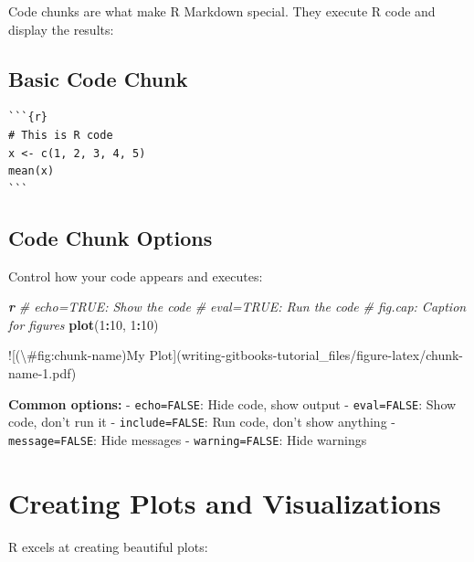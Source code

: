 \documentclass[
]{book}
\newenvironment{Shaded}{\begin{snugshade}}{\end{snugshade}}
\newcommand{\AlertTok}[1]{\textcolor[rgb]{0.94,0.16,0.16}{#1}}
\newcommand{\CommentTok}[1]{\textcolor[rgb]{0.56,0.35,0.01}{\textit{#1}}}
\newcommand{\DecValTok}[1]{\textcolor[rgb]{0.00,0.00,0.81}{#1}}
\newcommand{\FunctionTok}[1]{\textcolor[rgb]{0.13,0.29,0.53}{\textbf{#1}}}
\newcommand{\InformationTok}[1]{\textcolor[rgb]{0.56,0.35,0.01}{\textbf{\textit{#1}}}}
\newcommand{\NormalTok}[1]{#1}
\newcommand{\SpecialCharTok}[1]{\textcolor[rgb]{0.81,0.36,0.00}{\textbf{#1}}}
\begin{document}
Code chunks are what make R Markdown special. They execute R code and display the results:

\subsection{Basic Code Chunk}\label{basic-code-chunk}

\begin{verbatim}
```{r}
# This is R code
x <- c(1, 2, 3, 4, 5)
mean(x)
```
\end{verbatim}

\subsection{Code Chunk Options}\label{code-chunk-options}

Control how your code appears and executes:

\begin{Shaded}
\begin{Highlighting}[]

\InformationTok{\textasciigrave{}\textasciigrave{}\textasciigrave{} r}
\CommentTok{\# echo=TRUE: Show the code}
\CommentTok{\# eval=TRUE: Run the code  }
\CommentTok{\# fig.cap: Caption for figures}
\FunctionTok{plot}\NormalTok{(}\DecValTok{1}\SpecialCharTok{:}\DecValTok{10}\NormalTok{, }\DecValTok{1}\SpecialCharTok{:}\DecValTok{10}\NormalTok{)}
\InformationTok{\textasciigrave{}\textasciigrave{}\textasciigrave{}}

\AlertTok{![(\textbackslash{}\#fig:chunk{-}name)My Plot](writing{-}gitbooks{-}tutorial\_files/figure{-}latex/chunk{-}name{-}1.pdf)} 
\end{Highlighting}
\end{Shaded}

\textbf{Common options:}
- \texttt{echo=FALSE}: Hide code, show output
- \texttt{eval=FALSE}: Show code, don't run it
- \texttt{include=FALSE}: Run code, don't show anything
- \texttt{message=FALSE}: Hide messages
- \texttt{warning=FALSE}: Hide warnings

\section{Creating Plots and Visualizations}\label{creating-plots-and-visualizations}

R excels at creating beautiful plots:
\end{document}
